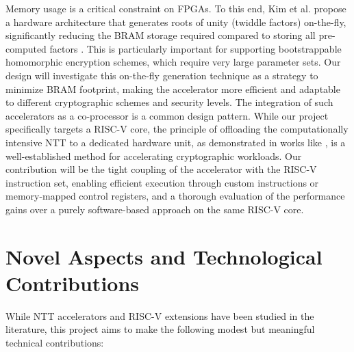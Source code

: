 \documentclass[a4paper, 12pt, titlepage]{article}
\begin{document}
Memory usage is a critical constraint on FPGAs. To this end, Kim et al. propose a hardware architecture that generates roots of unity (twiddle factors) on-the-fly, significantly reducing the BRAM storage required compared to storing all pre-computed factors \cite{Kim2020Hardware}. This is particularly important for supporting bootstrappable homomorphic encryption schemes, which require very large parameter sets. Our design will investigate this on-the-fly generation technique as a strategy to minimize BRAM footprint, making the accelerator more efficient and adaptable to different cryptographic schemes and security levels. The integration of such accelerators as a co-processor is a common design pattern. While our project specifically targets a RISC-V core, the principle of offloading the computationally intensive NTT to a dedicated hardware unit, as demonstrated in works like \cite{Li2021High, Kim2020Hardware, Roy2019FPGA}, is a well-established method for accelerating cryptographic workloads. Our contribution will be the tight coupling of the accelerator with the RISC-V instruction set, enabling efficient execution through custom instructions or memory-mapped control registers, and a thorough evaluation of the performance gains over a purely software-based approach on the same RISC-V core.


\section{Novel Aspects and Technological Contributions}

While NTT accelerators and RISC-V extensions have been studied in the literature, this project aims to make the following modest but meaningful technical contributions:
\end{document}
